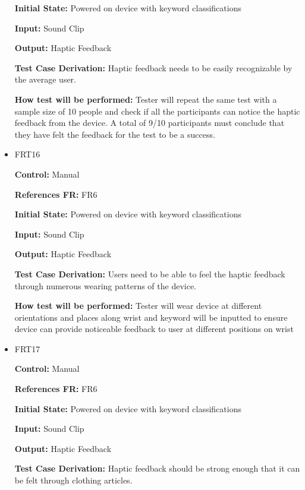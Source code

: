 \documentclass[12pt, titlepage]{article}
\begin{document}
\begin{itemize}
\textbf{Initial State:} Powered on device with keyword classifications
					
\textbf{Input:} Sound Clip
					
\textbf{Output:} Haptic Feedback

\textbf{Test Case Derivation:} Haptic feedback needs to be easily recognizable by the average user.
					
\textbf{How test will be performed:} Tester will repeat the same test with a sample size of 10 people and check if all the participants can notice the haptic feedback from the device. A total of 9/10 participants must conclude that they have felt the feedback for the test to be a success.


\item{FRT16}

\textbf{Control:} Manual

\textbf{References FR:} FR6 					

\textbf{Initial State:} Powered on device with keyword classifications
					
\textbf{Input:} Sound Clip
					
\textbf{Output:} Haptic Feedback

\textbf{Test Case Derivation:} Users need to be able to feel the haptic feedback through numerous wearing patterns of the device.
					
\textbf{How test will be performed:} Tester will wear device at different orientations and places along wrist and keyword will be inputted to ensure device can provide noticeable feedback to user at different positions on wrist


\item{FRT17}

\textbf{Control:} Manual

\textbf{References FR:} FR6 					

\textbf{Initial State:} Powered on device with keyword classifications
					
\textbf{Input:} Sound Clip
					
\textbf{Output:} Haptic Feedback

\textbf{Test Case Derivation:} Haptic feedback should be strong enough that it can be felt through clothing articles.
					

\end{itemize}
\end{document}

